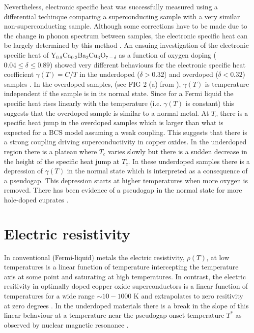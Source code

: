 Nevertheless, electronic specific heat was successfully measured using a differential techinque comparing a superconducting sample with a very similar non-superconducting sample. 
Although some corrections have to be made due to the change in phonon spectrum between samples, the electronic specific heat can be largely determined by this method \cite{Loram1990,Loram1993, Loram1994}.
An ensuing investigation of the electronic specific heat of Y$_{0.8}$Ca$_{0.2}$Ba$_2$Cu$_3$O$_{7-\delta}$ as a function of oxygen doping ($0.04\leq \delta \leq 0.89$) showed very different behaviours for the electronic specific heat coefficient $\gamma (T) = C/T$ in the underdoped ($\delta > 0.32$) and overdoped ($\delta < 0.32$) samples \cite{Loram1997}.
In the overdoped samples, (see FIG 2 (a) from \cite{Loram1997}), $\gamma (T)$ is temperature independent if the sample is in its normal state.
Since for a Fermi liquid the specific heat rises linearly with the temperature (i.e. $\gamma (T)$ is constant) this suggests that the overdoped sample is similar to a normal metal. 
At $T_c$ there is a specific heat jump in the overdoped samples which is larger than what is expected for a BCS model assuming a weak coupling.
This suggests that there is a strong coupling driving superconductivity in copper oxides.
In the underdoped region there is a plateau where $T_c$ varies slowly but there is a sudden decrease in the height of the specific heat jump at $T_c$.
In these underdoped samples there is a depression of $\gamma (T)$ in the normal state which is interpreted as a consequence of a pseudogap. 
This depression starts at higher temperatures when more oxygen is removed.
There has been evidence of a pseudogap in the normal state for more hole-doped cuprates \cite{Loram2001}.

\section{Electric resistivity}
\label{sec:resistivity}

In conventional (Fermi-liquid) metals the electric resistivity, $\rho(T)$, at low temperatures is a linear function of temperature intercepting the temperature axis at some point and saturating at high temperatures.
In contrast, the electric resitivity in optimally doped copper oxide superconductors is a linear function of temperatures for a wide range $\sim 10-1000$ K and extrapolates to zero resitivity at zero degrees \cite{Timusk1999,Muller2007}.
In the underdoped materials there is a break in the slope of this linear behaviour at a temperature near the pseudogap onset temperature $T^*$ as observed by nuclear magnetic resonance \cite{Bucher1993}.

